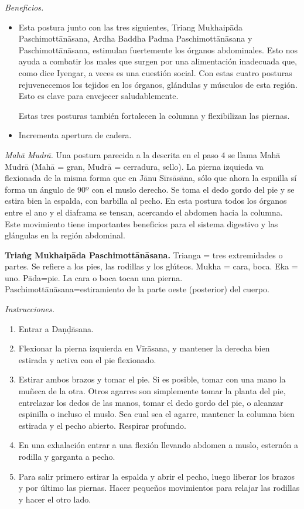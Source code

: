 \emph{Beneficios.}
\begin{itemize}
\item Esta postura junto con las tres
siguientes, Triang Mukhaipāda
Paschimottānāsana, Ardha Baddha Padma
Paschimottānāsana y Paschimottānāsana,
estimulan fuertemente los órganos
abdominales. Esto nos ayuda a combatir los
males que surgen por una alimentación
inadecuada que, como dice Iyengar, a veces es
una cuestión social. Con estas cuatro
posturas rejuvenecemos los tejidos en los
órganos, glándulas y músculos de esta región.
Esto es clave para envejecer saludablemente.

Estas tres posturas también fortalecen la
columna y flexibilizan las piernas.
\item Incrementa apertura de cadera.
\end{itemize}

\emph{Mahā Mudrā.} Una postura parecida a la
descrita en el paso 4 se llama Mahā Mudrā
(Mahā = gran, Mudrā = cerradura, sello). La
pierna izquieda va flexionada de la misma
forma que en Jānu Sīrsāsāna, sólo que ahora
la espnilla sí forma un ángulo de 90º con el
muslo derecho. Se toma el dedo gordo del pie
y se estira bien la espalda, con barbilla al
pecho. En esta postura todos los órganos
entre el ano y el diaframa se tensan,
acercando el abdomen hacia la columna. Este
movimiento tiene importantes beneficios para
el sistema digestivo y las glángulas en la
región abdominal.

\medskip\noindent\textbf{Triaṅg Mukhaipāda
Paschimottānāsana.}
Trianga = tres extremidades o partes. Se
refiere a los pies, las rodillas y los
glúteos. Mukha = cara, boca. Eka = uno.
Pāda=pie. La cara o boca tocan una pierna.
Paschimottānāsana=estiramiento de la parte
oeste (posterior) del cuerpo.

\emph{Instrucciones.}
\begin{enumerate}
\item Entrar a Daṇḍāsana.
\item Flexionar la pierna izquierda en
Vīrāsana, y mantener la derecha bien estirada
y activa con el pie flexionado.
\item Estirar ambos brazos y tomar el pie. Si
es posible, tomar con una mano la muñeca de
la otra. Otros agarres son simplemente tomar
la planta del pie, entrelazar los dedos de
las manos, tomar el dedo gordo del pie, o
alcanzar espinilla o incluso el muslo. Sea
cual sea el agarre, mantener la columna bien
estirada y el pecho abierto. Respirar
profundo.
\item En una exhalación entrar a una flexión
llevando abdomen a muslo, esternón a rodilla
y garganta a pecho.
\item Para salir primero estirar la espalda y
abrir el pecho, luego liberar los brazos y
por último las piernas. Hacer pequeños
movimientos para relajar las rodillas y hacer
el otro lado.
\end{enumerate}

